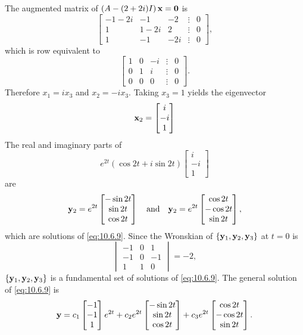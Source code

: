 \documentclass{ximera}
\begin{document}
\begin{example}
\begin{explanation}
The augmented  matrix of $\left(A-(2+2i)I\right){\bf x=0}$ is
$$
\begin{bmatrix}-1-2i&-1&-2&\vdots&0\\ 1&
1-2i&2&\vdots&0\\ 1&-1&-2i&\vdots&0
\end{bmatrix},
$$
which is row equivalent to
$$
\begin{bmatrix}1&0&-i&\vdots&0\\ 0&1&i&
\vdots&0\\ 0&0&0&\vdots&0\end{bmatrix}.
$$
Therefore $x_1=ix_3$ and $x_2=-ix_3$. Taking $x_3=1$ yields
the eigenvector
$$
{\bf x}_2=\begin{bmatrix} i\\-i\\1\end{bmatrix}
$$
The real and imaginary parts of
$$
e^{2t}(\cos2t+i\sin2t)\begin{bmatrix} i\\-i\\1\end{bmatrix}
$$
are
$$
{\bf y}_2=e^{2t}\begin{bmatrix}-\sin2t\\\sin2t\\\cos
2t\end{bmatrix}\quad\mbox{and}\quad
{\bf y}_2=e^{2t}\begin{bmatrix}\cos2t\\-\cos2t\\\sin
2t\end{bmatrix},
$$
which are solutions of  \eqref{eq:10.6.9}.
Since  the Wronskian of $\{{\bf y}_1,{\bf y}_2,{\bf y}_3\}$
at $t=0$ is
$$
\begin{vmatrix}
-1&0&1\\-1&0&-1\\1&1&0\end{vmatrix}=-2,
$$
$\{{\bf y}_1,{\bf y}_2,{\bf y}_3\}$ is a fundamental set of solutions
of \eqref{eq:10.6.9}.  The general solution of \eqref{eq:10.6.9} is
$$
{\bf y}=c_1\begin{bmatrix}-1\\-1\\1\end{bmatrix}e^{2t}+
c_2e^{2t}\begin{bmatrix}-\sin2t\\\sin2t\\\cos
2t\end{bmatrix}+
c_3e^{2t}\begin{bmatrix}\cos2t\\-\cos2t\\\sin
2t\end{bmatrix}.
$$
\end{explanation}
\end{example}
\end{document}
